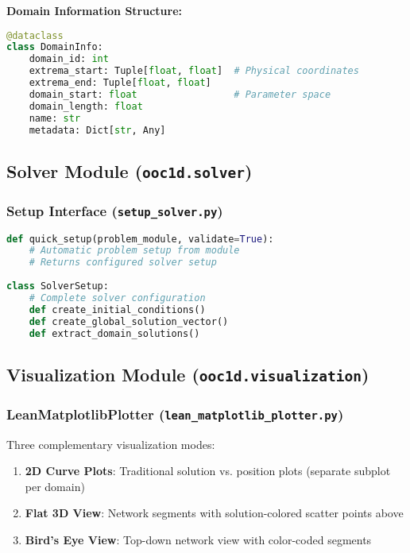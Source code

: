 \documentclass[11pt,a4paper]{article}
\newcommand{\code}[1]{\texttt{#1}}
\begin{document}
\textbf{Domain Information Structure:}
\begin{lstlisting}[language=Python, caption={Domain Information Dataclass}]
@dataclass
class DomainInfo:
    domain_id: int
    extrema_start: Tuple[float, float]  # Physical coordinates
    extrema_end: Tuple[float, float]
    domain_start: float                 # Parameter space
    domain_length: float
    name: str
    metadata: Dict[str, Any]
\end{lstlisting}

\subsection{Solver Module (\code{ooc1d.solver})}

\subsubsection{Setup Interface (\code{setup\_solver.py})}

\begin{lstlisting}[language=Python, caption={Setup Interface}]
def quick_setup(problem_module, validate=True):
    # Automatic problem setup from module
    # Returns configured solver setup
    
class SolverSetup:
    # Complete solver configuration
    def create_initial_conditions()
    def create_global_solution_vector()
    def extract_domain_solutions()
\end{lstlisting}

\subsection{Visualization Module (\code{ooc1d.visualization})}

\subsubsection{LeanMatplotlibPlotter (\code{lean\_matplotlib\_plotter.py})}

Three complementary visualization modes:

\begin{enumerate}
    \item \textbf{2D Curve Plots}: Traditional solution vs. position plots (separate subplot per domain)
    \item \textbf{Flat 3D View}: Network segments with solution-colored scatter points above
    \item \textbf{Bird's Eye View}: Top-down network view with color-coded segments
\end{enumerate}
\end{document}
